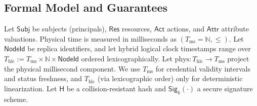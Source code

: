 \documentclass[10pt,journal,compsoc]{IEEEtran}
\begin{document}




\subsection{Formal Model and Guarantees}\label{subsec:formal-model}

Let $\mathsf{Subj}$ be subjects (principals), $\mathsf{Res}$ resources, $\mathsf{Act}$ actions, and $\mathsf{Attr}$ attribute valuations.
Physical time is measured in milliseconds as $(T_{\mathrm{ms}}=\mathbb{N}, \le)$.
Let $\mathsf{NodeId}$ be replica identifiers, and let hybrid logical clock timestamps range over
$T_{\mathrm{hlc}} := T_{\mathrm{ms}} \times \mathbb{N} \times \mathsf{NodeId}$ ordered lexicographically.
Let $\mathrm{phys} : T_{\mathrm{hlc}} \to T_{\mathrm{ms}}$ project the physical millisecond component.
We use $T_{\mathrm{ms}}$ for credential validity intervals and status freshness, and $T_{\mathrm{hlc}}$ (via lexicographic order) only for deterministic linearization.
Let $\mathsf{H}$ be a collision-resistant hash and $\mathsf{Sig}_k(\cdot)$ a secure signature scheme.
\end{document}

